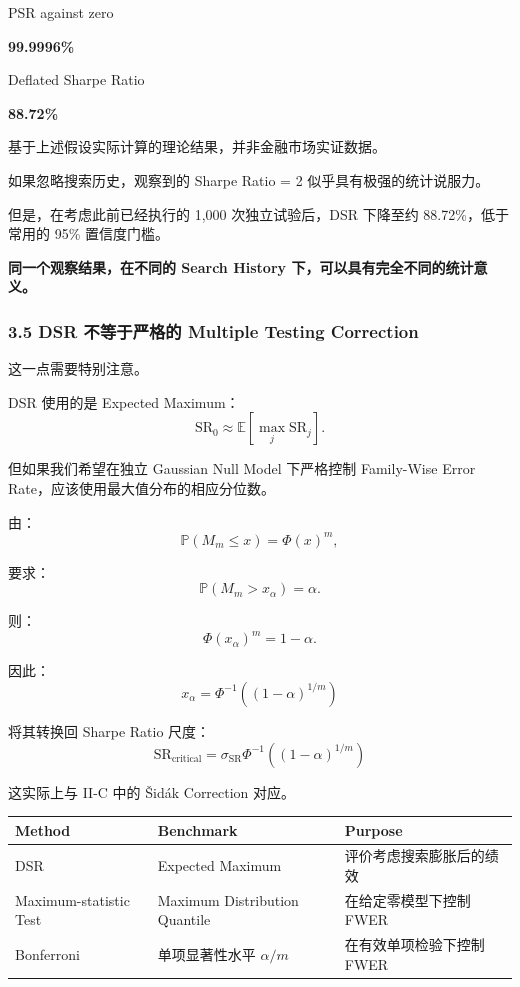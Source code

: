 PSR against zero

\textbf{99.9996\%}

Deflated Sharpe Ratio

\textbf{88.72\%}

基于上述假设实际计算的理论结果，并非金融市场实证数据。

如果忽略搜索历史，观察到的 Sharpe Ratio = 2 似乎具有极强的统计说服力。

但是，在考虑此前已经执行的 1,000 次独立试验后，DSR 下降至约 88.72\%，低于常用的 95\% 置信度门槛。

\textbf{同一个观察结果，在不同的 Search History 下，可以具有完全不同的统计意义。}

\hypertarget{part-4-71-0001-dsr-ux4e0dux7b49ux4e8eux4e25ux683cux7684-multiple-testing-correction}{%
\subsubsection{3.5 DSR 不等于严格的 Multiple Testing Correction}\label{part-4-71-0001-dsr-ux4e0dux7b49ux4e8eux4e25ux683cux7684-multiple-testing-correction}}

这一点需要特别注意。

DSR 使用的是 Expected Maximum：
\[\mathrm{SR}_0
\approx
\mathbb E\left[\max_j\widehat{\mathrm{SR}}_j\right].\]

但如果我们希望在独立 Gaussian Null Model 下严格控制 Family-Wise Error Rate，应该使用最大值分布的相应分位数。

由：
\[\mathbb P(M_m\leq x)=\Phi(x)^m,\]

要求：
\[\mathbb P(M_m>x_\alpha)=\alpha.\]

则：
\[\Phi(x_\alpha)^m=1-\alpha.\]

因此：
\[\boxed{
x_\alpha
=
\Phi^{-1}\left((1-\alpha)^{1/m}\right)
}\]

将其转换回 Sharpe Ratio 尺度：
\[\boxed{
\mathrm{SR}_{\mathrm{critical}}
=
\sigma_{\mathrm{SR}}
\Phi^{-1}\left((1-\alpha)^{1/m}\right)
}\]

这实际上与 II-C 中的 Šidák Correction 对应。

\begin{readertable}
\begin{longtable}[]{@{}
  >{\raggedright\arraybackslash}p{}
  >{\raggedright\arraybackslash}p{}
  >{\raggedright\arraybackslash}p{}@{}}
\toprule
Method & Benchmark & Purpose \\
\midrule
\endhead
DSR & Expected Maximum & 评价考虑搜索膨胀后的绩效 \\
Maximum-statistic Test & Maximum Distribution Quantile & 在给定零模型下控制 FWER \\
Bonferroni & 单项显著性水平 \(\alpha/m\) & 在有效单项检验下控制 FWER \\
\bottomrule
\end{longtable}
\end{readertable}

